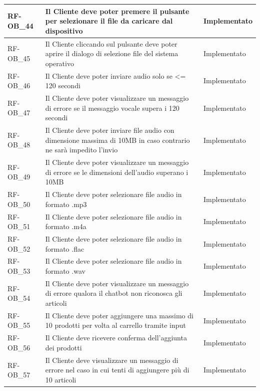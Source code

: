 \begin{longtable}{|>{\raggedright}p{}|>{\raggedright\arraybackslash}p{}|>{\raggedright\arraybackslash}p{}|}
	\hline
	RF-OB\_44 \hypertarget{rf-ob_44} & Il Cliente deve poter premere il pulsante per selezionare il file da caricare dal dispositivo & Implementato \\
	\hline
	RF-OB\_45 \hypertarget{rf-ob_45} & Il Cliente cliccando sul pulsante deve poter aprire il dialogo di selezione file del sistema operativo & Implementato \\
	\hline
	RF-OB\_46 \hypertarget{rf-ob_46} & Il Cliente deve poter inviare audio solo se <= 120 secondi & Implementato \\
	\hline
	RF-OB\_47 \hypertarget{rf-ob_47} & Il Cliente deve poter visualizzare un messaggio di errore se il messaggio vocale supera i 120 secondi & Implementato \\
	\hline
	RF-OB\_48 \hypertarget{rf-ob_48} & Il Cliente deve poter inviare file audio con dimensione massima di 10MB in caso contrario ne sarà impedito l'invio & Implementato \\
	\hline
	RF-OB\_49 \hypertarget{rf-ob_49} & Il Cliente deve poter visualizzare un messaggio di errore se le dimensioni dell'audio superano i 10MB & Implementato \\
	\hline
	RF-OB\_50 \hypertarget{rf-ob_50} & Il Cliente deve poter selezionare file audio in formato .mp3 & Implementato\\
	\hline
	RF-OB\_51 \hypertarget{rf-ob_51} & Il Cliente deve poter selezionare file audio in formato .m4a & Implementato \\
	\hline
	RF-OB\_52 \hypertarget{rf-ob_52} & Il Cliente deve poter selezionare file audio in formato .flac & Implementato \\
	\hline
	RF-OB\_53 \hypertarget{rf-ob_53} & Il Cliente deve poter selezionare file audio in formato .wav & Implementato \\
	\hline
	RF-OB\_54 \hypertarget{rf-ob_54} & Il Cliente deve poter visualizzare un messaggio di errore qualora il chatbot non riconosca gli articoli & Implementato \\
	\hline
	RF-OB\_55 \hypertarget{rf-ob_55} & Il Cliente deve poter aggiungere una massimo di 10 prodotti per volta al carrello tramite input & Implementato \\
	\hline
	RF-OB\_56 \hypertarget{rf-ob_56} & Il Cliente deve ricevere conferma dell'aggiunta dei prodotti & Implementato \\
	\hline
	RF-OB\_57 \hypertarget{rf-ob_57} & Il Cliente deve visualizzare un messaggio di errore nel caso in cui tenti di aggiungere più di 10 articoli & Implementato \\

\end{longtable}
